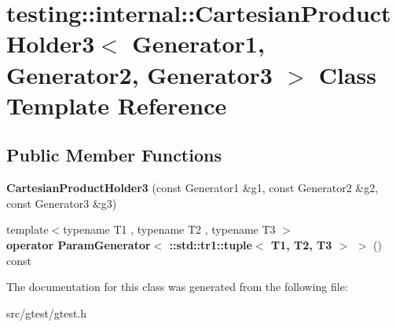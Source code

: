 \hypertarget{classtesting_1_1internal_1_1_cartesian_product_holder3}{}\section{testing\+:\+:internal\+:\+:Cartesian\+Product\+Holder3$<$ Generator1, Generator2, Generator3 $>$ Class Template Reference}
\label{classtesting_1_1internal_1_1_cartesian_product_holder3}
\subsection*{Public Member Functions}
\begin{DoxyCompactItemize}
\item 
\mbox{\label{classtesting_1_1internal_1_1_cartesian_product_holder3_ad74b6d31441c7f3f7f8514a563c8277e}} 
{\bfseries Cartesian\+Product\+Holder3} (const Generator1 \&g1, const Generator2 \&g2, const Generator3 \&g3)
\item 
\mbox{\label{classtesting_1_1internal_1_1_cartesian_product_holder3_a1b5f9aa11c781bf1316fd6df4947eba4}} 
{\footnotesize template$<$typename T1 , typename T2 , typename T3 $>$ }\\{\bfseries operator Param\+Generator$<$ \+::std\+::tr1\+::tuple$<$ T1, T2, T3 $>$ $>$} () const
\end{DoxyCompactItemize}


The documentation for this class was generated from the following file\+:\begin{DoxyCompactItemize}
\item 
src/gtest/gtest.\+h\end{DoxyCompactItemize}
